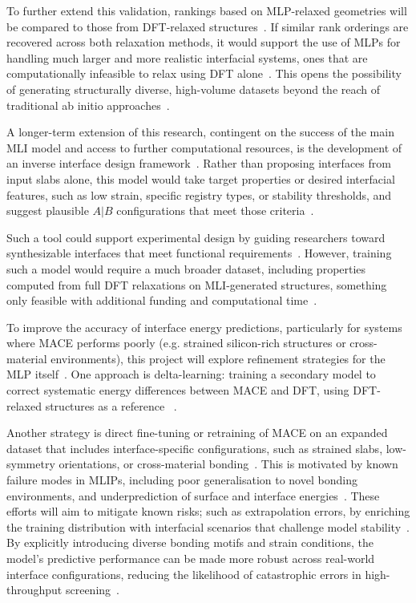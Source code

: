 \label{objectives_relaxation_scaling} To further extend this validation, rankings based on MLP-relaxed geometries will be compared to those from DFT-relaxed structures~\nocite{}.
If similar rank orderings are recovered across both relaxation methods, it would support the use of MLPs for handling much larger and more realistic interfacial systems, ones that are computationally infeasible to relax using DFT alone~\nocite{}.
This opens the possibility of generating structurally diverse, high-volume datasets beyond the reach of traditional ab initio approaches~\nocite{}.

\label{objectives_inverse_design} %

A longer-term extension of this research, contingent on the success of the main MLI model and access to further computational resources, is the development of an inverse interface design framework~\nocite{}.
Rather than proposing interfaces from input slabs alone, this model would take target properties or desired interfacial features, such as low strain, specific registry types, or stability thresholds, and suggest plausible $A|B$ configurations that meet those criteria~\nocite{}.

\label{objectives_inverse_limitations} Such a tool could support experimental design by guiding researchers toward synthesizable interfaces that meet functional requirements~\nocite{}.
However, training such a model would require a much broader dataset, including properties computed from full DFT relaxations on MLI-generated structures, something only feasible with additional funding and computational time~\nocite{}.

\newpage \label{objectives_mlp_refinement} To improve the accuracy of interface energy predictions, particularly for systems where MACE performs poorly (e.g. strained silicon-rich structures or cross-material environments), this project will explore refinement strategies for the MLP itself~\nocite{}.
One approach is delta-learning: training a secondary model to correct systematic energy differences between MACE and DFT, using DFT-relaxed structures as a reference ~\cite{Pitfield2025-ah}.

\label{objectives_mlp_tuning} Another strategy is direct fine-tuning or retraining of MACE on an expanded dataset that includes interface-specific configurations, such as strained slabs, low-symmetry orientations, or cross-material bonding~\nocite{}.
This is motivated by known failure modes in MLIPs, including poor generalisation to novel bonding environments, and underprediction of surface and interface energies~\cite{Leung2020-tv, Uhrin2025-ba}.
These efforts will aim to mitigate known risks; such as extrapolation errors, by enriching the training distribution with interfacial scenarios that challenge model stability~\nocite{}.
By explicitly introducing diverse bonding motifs and strain conditions, the model's predictive performance can be made more robust across real-world interface configurations, reducing the likelihood of catastrophic errors in high-throughput screening~\nocite{}.

